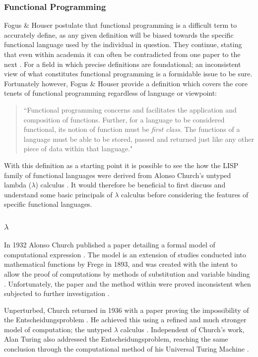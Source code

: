 \documentclass[12pt,a4paper]{article}
\begin{document}
\subsubsection{Functional Programming}

Fogus \& Houser postulate that functional programming is a difficult term to accurately define, as any given definition will be biased towards the specific functional language used by the individual in question. They continue, stating that even within academia it can often be contradicted from one paper to the next \cite{joyOfClojure}. For a field in which precise definitions are foundational; an inconsistent view of what constitutes functional programming is a formidable issue to be sure. Fortunately however, Fogus \& Houser provide a definition which covers the core tenets of functional programming regardless of language or viewpoint:
\begin{quote}
``Functional programming concerns and facilitates the application and composition of functions. Further, for a language to be considered functional, its notion of function must be \textit{first class}. The functions of a language must be able to be stored, passed and returned just like any other piece of data within that language." \cite{joyOfClojure}
\end{quote}

With this definition as a starting point it is possible to see the how the LISP family of functional languages were derived from Alonso Church's untyped lambda ($\lambda$) calculus \cite{church1936,lispPart1}. It would therefore be beneficial to first discuss and understand some basic principals of $\lambda$ calculus before considering the features of specific functional languages.

\subsubsection{$\lambda$}

In 1932 Alonso Church published a paper detailing a formal model of computational expression \cite{church1932}. The model is an extension of studies conducted into mathematical functions by Frege in 1893, and was created with the intent to allow the proof of computations by methods of substitution and variable binding \cite{lambdaHighlights}. Unfortunately, the paper and the method within were proved inconsistent when subjected to further investigation \cite{lambdaHighlights}.

Unperturbed, Church returned in 1936 with a paper proving the impossibility of the Entscheidungsproblem \cite{church1936,churchTuringThesis}. He achieved this using a refined and much stronger model of computation; the untyped $\lambda$ calculus \cite{church1936}. Independent of Church's work, Alan Turing also addressed the Entscheidungsproblem, reaching the same conclusion through the computational method of his Universal Turing Machine \cite{turing1936,churchTuringThesis}.
\end{document}
